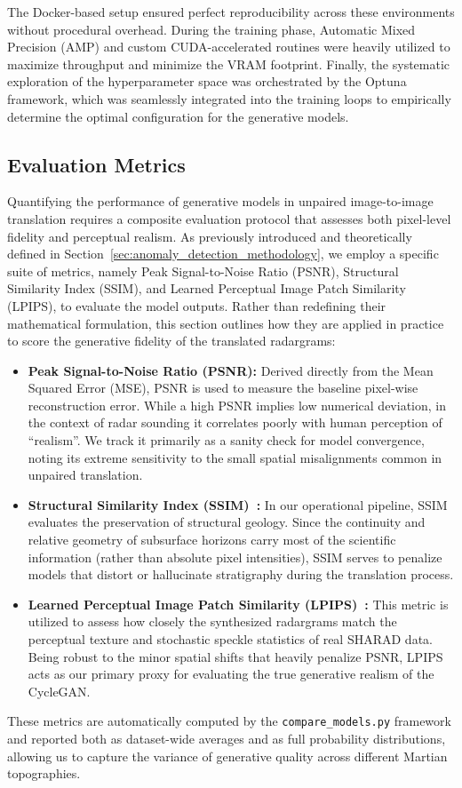 The Docker-based setup ensured perfect reproducibility across these environments without procedural overhead.
During the training phase, Automatic Mixed Precision (AMP) and custom CUDA-accelerated routines were heavily utilized to maximize throughput and minimize the VRAM footprint.
Finally, the systematic exploration of the hyperparameter space was orchestrated by the Optuna framework, which was seamlessly integrated into the training loops to empirically determine the optimal configuration for the generative models.

\subsection{Evaluation Metrics}
\label{subsec:evaluation_metrics}
Quantifying the performance of generative models in unpaired image-to-image translation requires a composite evaluation protocol that assesses both pixel-level fidelity and perceptual realism.
As previously introduced and theoretically defined in Section~\ref{sec:anomaly_detection_methodology}, we employ a specific suite of metrics, namely Peak Signal-to-Noise Ratio (PSNR), Structural Similarity Index (SSIM), and Learned Perceptual Image Patch Similarity (LPIPS), to evaluate the model outputs.
Rather than redefining their mathematical formulation, this section outlines how they are applied in practice to score the generative fidelity of the translated radargrams:

\begin{itemize}
    \item \textbf{Peak Signal-to-Noise Ratio (PSNR):} Derived directly from the Mean Squared Error (MSE), PSNR is used to measure the baseline pixel-wise reconstruction error. While a high PSNR implies low numerical deviation, in the context of radar sounding it correlates poorly with human perception of \enquote{realism}. We track it primarily as a sanity check for model convergence, noting its extreme sensitivity to the small spatial misalignments common in unpaired translation.
    \item \textbf{Structural Similarity Index (SSIM)~\cite{Wang_2004}:} In our operational pipeline, SSIM evaluates the preservation of structural geology. Since the continuity and relative geometry of subsurface horizons carry most of the scientific information (rather than absolute pixel intensities), SSIM serves to penalize models that distort or hallucinate stratigraphy during the translation process.
    \item \textbf{Learned Perceptual Image Patch Similarity (LPIPS)~\cite{Zhang_2018_CVPR}:} This metric is utilized to assess how closely the synthesized radargrams match the perceptual texture and stochastic speckle statistics of real SHARAD data. Being robust to the minor spatial shifts that heavily penalize PSNR, LPIPS acts as our primary proxy for evaluating the true generative realism of the CycleGAN.
\end{itemize}

These metrics are automatically computed by the \texttt{compare\_models.py} framework and reported both as dataset-wide averages and as full probability distributions, allowing us to capture the variance of generative quality across different Martian topographies.


